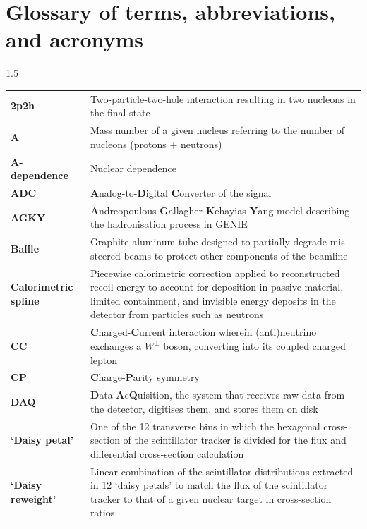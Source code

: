 \chapter*{Glossary of terms, abbreviations, and acronyms}

\begin{spacing}{1.5}
\begin{longtable}[l]{p{} p{}}
    \textbf{2p2h} & Two-particle-two-hole interaction resulting in two nucleons in the final state \\
        \textbf{$\bm{A}$} & Mass number of a given nucleus referring to the number of nucleons (protons + neutrons) \\
        \textbf{$\bm{A}$-dependence} & Nuclear dependence \\
        \textbf{ADC} & \textbf{A}nalog-to-\textbf{D}igital \textbf{C}onverter of the signal \\
        \textbf{AGKY} & \textbf{A}ndreopoulous-\textbf{G}allagher-\textbf{K}ehayias-\textbf{Y}ang model describing the hadronisation process in GENIE \\
        \textbf{Baffle} & Graphite-aluminum tube designed to partially degrade mis-steered beams to protect other components of the beamline \\
        \textbf{Calorimetric spline} & Piecewise calorimetric correction applied to reconstructed recoil energy to account for deposition in passive material, limited containment, and invisible energy deposits in the detector from particles such as neutrons    \\
        \textbf{CC} & \textbf{C}harged-\textbf{C}urrent interaction wherein (anti)neutrino exchanges a $W^{\pm}$ boson, converting into its coupled charged lepton \\
        \textbf{CP} & \textbf{C}harge-\textbf{P}arity symmetry  \\
        \textbf{DAQ} & \textbf{D}ata \textbf{A}c\textbf{Q}uisition, the system that receives raw data from the detector, digitises them, and stores them on disk \\
        \textbf{`Daisy petal'} & One of the 12 transverse bins in which the hexagonal cross-section of the scintillator tracker is divided for the flux and differential cross-section calculation \\
        \textbf{`Daisy reweight'} & Linear combination of the scintillator distributions extracted in 12 `daisy petals' to match the flux of the scintillator tracker to that of a given nuclear target in cross-section ratios  \\

\end{longtable}
\end{spacing}
